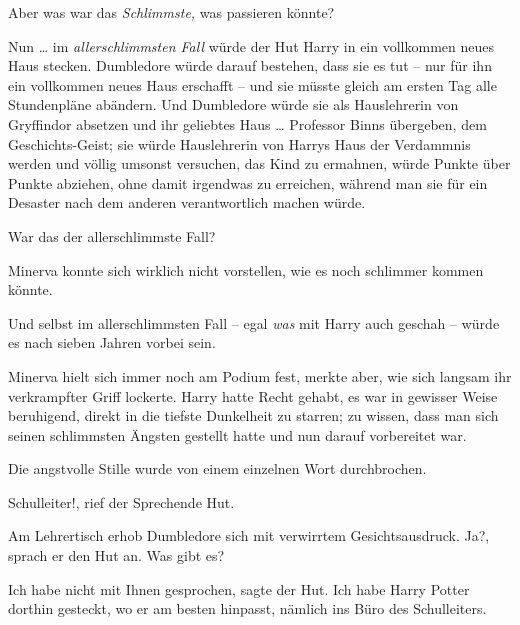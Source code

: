 Aber was war das \emph{Schlimmste,} was passieren könnte?

Nun … im \emph{allerschlimmsten Fall} würde der Hut Harry in ein vollkommen
neues Haus stecken. Dumbledore würde darauf bestehen, dass sie es tut – nur für
ihn ein vollkommen neues Haus erschafft – und sie müsste gleich am ersten Tag
alle Stundenpläne abändern. Und Dumbledore würde sie als Hauslehrerin von
Gryffindor absetzen und ihr geliebtes Haus … Professor Binns übergeben, dem
Geschichts-Geist; sie würde Hauslehrerin von Harrys Haus der Verdammnis werden
und völlig umsonst versuchen, das Kind zu ermahnen, würde Punkte über Punkte
abziehen, ohne damit irgendwas zu erreichen, während man sie für ein Desaster
nach dem anderen verantwortlich machen würde.

War das der allerschlimmste Fall?

Minerva konnte sich wirklich nicht vorstellen, wie es noch schlimmer kommen
könnte.

Und selbst im allerschlimmsten Fall – egal \emph{was} mit Harry auch geschah –
würde es nach sieben Jahren vorbei sein.

Minerva hielt sich immer noch am Podium fest, merkte aber, wie sich langsam ihr
verkrampfter Griff lockerte. Harry hatte Recht gehabt, es war in gewisser Weise
beruhigend, direkt in die tiefste Dunkelheit zu starren; zu wissen, dass man
sich seinen schlimmsten Ängsten gestellt hatte und nun darauf vorbereitet war.

Die angstvolle Stille wurde von einem einzelnen Wort durchbrochen.

\glqq{}Schulleiter!\grqq{}, rief der Sprechende Hut.

Am Lehrertisch erhob Dumbledore sich mit verwirrtem Gesichtsausdruck. \glqq
Ja?\grqq{}, sprach er den Hut an. \glqq{}Was gibt es?\grqq{}

\glqq{}Ich habe nicht mit Ihnen gesprochen\grqq{}, sagte der Hut. \glqq{}Ich habe
Harry Potter dorthin gesteckt, wo er am besten hinpasst, nämlich ins Büro des
Schulleiters.\grqq{}